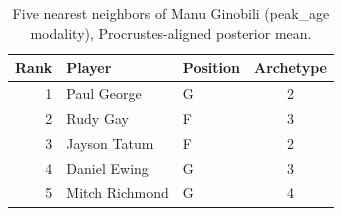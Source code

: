\begin{table}[htbp]
  \centering\small
  \begin{tabular}{rllc}
    \toprule
    Rank & Player & Position & Archetype \\
    \midrule
    1 & Paul George & G & 2 \\
    2 & Rudy Gay & F & 3 \\
    3 & Jayson Tatum & F & 2 \\
    4 & Daniel Ewing & G & 3 \\
    5 & Mitch Richmond & G & 4 \\
    \bottomrule
  \end{tabular}
  \caption{Five nearest neighbors of Manu Ginobili (peak_age modality), Procrustes-aligned posterior mean.}
  \label{tab:Manu_Ginobili_neighbors_peak_age}
\end{table}

